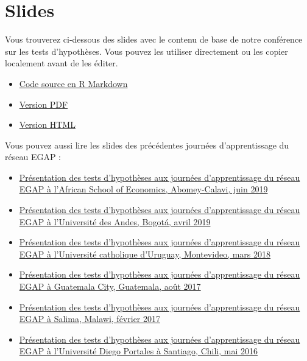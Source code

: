 \documentclass[12pt,]{book}
\begin{document}
\hypertarget{slides-3}{%
\section{Slides}\label{slides-3}}

Vous trouverez ci-dessous des slides avec le contenu de base de notre conférence sur les tests d'hypothèses. Vous pouvez les utiliser directement ou les copier localement avant de les éditer.

\begin{itemize}
\item
  \href{https://egap.github.io/learningdays-resources/Slides_fr/hypothesistesting-slides.Rmd}{Code source en R Markdown}
\item
  \href{https://egap.github.io/learningdays-resources/Slides_fr/hypothesistesting-slides.pdf}{Version PDF}
\item
  \href{https://egap.github.io/learningdays-resources/Slides_fr/hypothesistesting-slides.html}{Version HTML}
\end{itemize}

Vous pouvez aussi lire les slides des précédentes journées d'apprentissage du réseau EGAP :

\begin{itemize}
\item
  \href{https://egap.github.io/learningdays-resources/Slides/Examples/hypothesistesting-benin.pdf}{Présentation des tests d'hypothèses aux journées d'apprentissage du réseau EGAP à l'African School of Economics, Abomey-Calavi, juin 2019}
\item
  \href{https://egap.github.io/learningdays-resources/Slides/Examples/hypothesistesting-bogota.pdf}{Présentation des tests d'hypothèses aux journées d'apprentissage du réseau EGAP à l'Université des Andes, Bogotá, avril 2019}
\item
  \href{https://egap.github.io/learningdays-resources/Slides/Examples/hypothesistesting-montevideo.pdf}{Présentation des tests d'hypothèses aux journées d'apprentissage du réseau EGAP à l'Université catholique d'Uruguay, Montevideo, mars 2018}
\item
  \href{https://egap.github.io/learningdays-resources/Slides/Examples/hypothesistesting-guatemala.pdf}{Présentation des tests d'hypothèses aux journées d'apprentissage du réseau EGAP à Guatemala City, Guatemala, août 2017}
\item
  \href{https://egap.github.io/learningdays-resources/Slides/Examples/hypothesistesting-malawi.pdf}{Présentation des tests d'hypothèses aux journées d'apprentissage du réseau EGAP à Salima, Malawi, février 2017}
\item
  \href{https://egap.github.io/learningdays-resources/Slides/Examples/hypothesistesting-santiago.pdf}{Présentation des tests d'hypothèses aux journées d'apprentissage du réseau EGAP à l'Université Diego Portales à Santiago, Chili, mai 2016}
\end{itemize}
\end{document}
